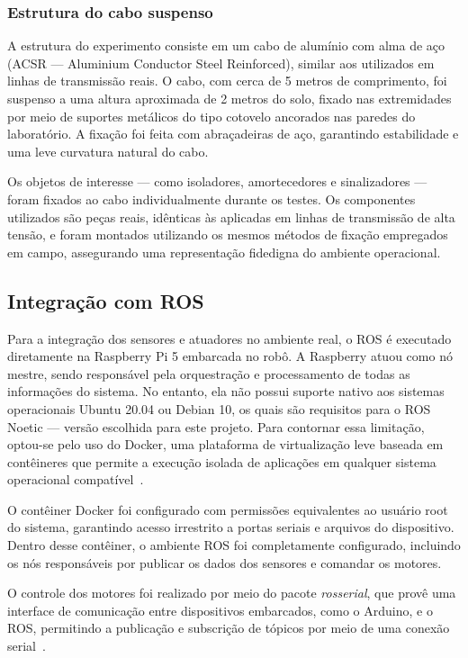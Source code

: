 \subsubsection{Estrutura do cabo suspenso}

A estrutura do experimento consiste em um cabo de alumínio com alma de aço (ACSR — Aluminium Conductor Steel Reinforced), similar aos utilizados em linhas de transmissão reais. O cabo, com cerca de 5 metros de comprimento, foi suspenso a uma altura aproximada de 2 metros do solo, fixado nas extremidades por meio de suportes metálicos do tipo cotovelo ancorados nas paredes do laboratório. A fixação foi feita com abraçadeiras de aço, garantindo estabilidade e uma leve curvatura natural do cabo.

Os objetos de interesse — como isoladores, amortecedores e sinalizadores — foram fixados ao cabo individualmente durante os testes. Os componentes utilizados são peças reais, idênticas às aplicadas em linhas de transmissão de alta tensão, e foram montados utilizando os mesmos métodos de fixação empregados em campo, assegurando uma representação fidedigna do ambiente operacional.

\subsection{Integração com ROS}

Para a integração dos sensores e atuadores no ambiente real, o ROS é executado diretamente na Raspberry Pi 5 embarcada no robô. A Raspberry atuou como nó mestre, sendo responsável pela orquestração e processamento de todas as informações do sistema. No entanto, ela não possui suporte nativo aos sistemas operacionais Ubuntu 20.04 ou Debian 10, os quais são requisitos para o ROS Noetic — versão escolhida para este projeto. Para contornar essa limitação, optou-se pelo uso do Docker, uma plataforma de virtualização leve baseada em contêineres que permite a execução isolada de aplicações em qualquer sistema operacional compatível~\cite{merkel2014docker}.

O contêiner Docker foi configurado com permissões equivalentes ao usuário root do sistema, garantindo acesso irrestrito a portas seriais e arquivos do dispositivo. Dentro desse contêiner, o ambiente ROS foi completamente configurado, incluindo os nós responsáveis por publicar os dados dos sensores e comandar os motores.

O controle dos motores foi realizado por meio do pacote \textit{rosserial}, que provê uma interface de comunicação entre dispositivos embarcados, como o Arduino, e o ROS, permitindo a publicação e subscrição de tópicos por meio de uma conexão serial~\cite{rosserial}.

